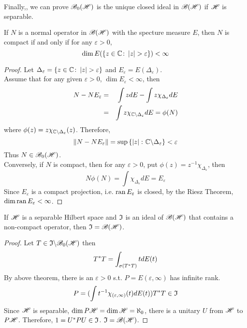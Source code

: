 Finally,, we can prove $\mathscr{B}_{0}\mathscr{(H)}$ is the unique closed ideal in $\mathscr{B(H)}$ if $\mathscr{H}$ is separable. 
\begin{prop}
	If $N$ is a normal operator in $\mathscr{B(H)}$ with the specture measure $E$, then $N$ is compact if and only if for any $\varepsilon > 0$,
	\begin{equation*}
		\dim{E(\{z \in \mathbb{C}\colon \left\lvert z\right\lvert > \varepsilon\})} < \infty
	\end{equation*}
\end{prop}
\begin{proof}
	Let $\Delta_{\varepsilon} = \{z \in \mathbb{C} \colon \left\lvert z\right\lvert > \varepsilon\}$ and $E_{\varepsilon} = E(\Delta_{\varepsilon})$.\\
	Assume that for any given $\varepsilon > 0$, $\dim{E_{\varepsilon}} < \infty$, then
	\begin{eqnarray*}
		N - NE_{\varepsilon} &=& \int z dE - \int z\chi_{\Delta_{\varepsilon}} dE \\
		&=& \int z\chi_{\mathbb{C} \backslash \Delta_{\varepsilon}} dE = \phi(N)
	\end{eqnarray*}
	where $\phi(z) = z\chi_{\mathbb{C} \backslash \Delta_{\varepsilon}}(z)$. Therefore,
	\begin{equation*}
		\left\lVert N - NE_{\varepsilon}\right\lVert = \sup{\{\left\lvert z\right\lvert \colon \mathbb{C}\backslash \Delta_{\varepsilon}\}} < \varepsilon
	\end{equation*}
	Thus $N \in \mathscr{B}_{0}\mathscr{(H)}$. \\
	Conversely, if $N$ is compact, then for any $\varepsilon > 0$, put $\phi(z) = z^{-1}\chi_{\Delta_{\varepsilon}}$, then
	\begin{equation*}
		N\phi(N) = \int \chi_{\Delta_{\varepsilon}} dE = E_{\varepsilon} 
	\end{equation*}
	Since $E_{\varepsilon}$ is a compact projection, i.e. $\operatorname{ran}{E_{\varepsilon}}$ is closed, by the Riesz Theorem, $\dim{\operatorname{ran}{E_{\varepsilon}}} < \infty$.
\end{proof}

\begin{thm}
	If $\mathscr{H}$ is a separable Hilbert space and $\mathfrak{I}$ is an ideal of $\mathscr{B(H)}$ that contains a non-compact operator, then $\mathfrak{I} = \mathscr{B(H)}$.
\end{thm}
\begin{proof}
	Let $T \in \mathfrak{I} \backslash \mathscr{B}_{0}\mathscr{(H)}$ then 
	\begin{equation*}
		T^{*}T = \int_{\sigma(T^{*}T)} t dE(t)
	\end{equation*}
	By above theorem, there is an $\varepsilon > 0$ s.t. $P = E(\varepsilon,\infty)$ has infinite rank. 
	\begin{equation*}
		P = (\int t^{-1}\chi_{(\varepsilon,\infty)}(t)dE(t))T^{*}T \in \mathfrak{I}
	\end{equation*}
	Since $\mathscr{H}$ is separable, $\dim{P\mathscr{H}} = \dim{\mathscr{H}} = \aleph_0$, there is a unitary $U$ from $\mathscr{H}$ to $P\mathscr{H}$. Therefore, $1 = U^{*}PU \in \mathfrak{I}$. $\mathfrak{I} = \mathscr{B(H)}$.
\end{proof}

